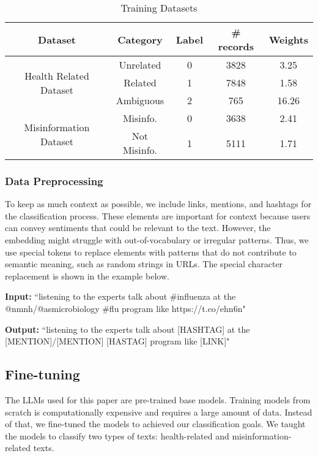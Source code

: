 \begin{table}[htbp]
	\centering
	\caption{Training Datasets}
	{\scriptsize
	\begin{tabular}{||c | c | c | c | c||} 
		\hline
		\textbf{Dataset} &
		\textbf{Category} & \textbf{Label} & \textbf{\# records} & \textbf{Weights} \\
		\hline
		\multirow{3}{6.1em}{Health Related Dataset} & Unrelated & 0 & 3828 & 3.25  \\
		& Related & 1 & 7848 & 1.58  \\ 
		& Ambiguous & 2 & 765 & 16.26 \\
		\hline
		\multirow{2}{6.1em}{Misinformation Dataset} & Misinfo. & 0 & 3638 & 2.41\\ 
		& Not Misinfo. & 1 & 5111 & 1.71 \\
		\hline
	\end{tabular}
	}
	\label{table:dataset}
\end{table}

\subsubsection{Data Preprocessing}
To keep as much context as possible, we include links, mentions, and hashtags for the classification process. These elements are important for context because users can convey sentiments that could be relevant to the text.
However, the embedding might struggle with out-of-vocabulary or irregular patterns. Thus, we use special tokens to replace elements with patterns that do not contribute
to semantic meaning, such as random strings in URLs. The special character replacement is shown in the example below.

{\footnotesize %
\begin{tcolorbox}[colback=gray!5,colframe=black!50,boxrule=0.4pt,arc=2pt,left=0.5mm,right=0.5mm,top=0.1mm,bottom=0.1mm,title=Example]
\textbf{Input:}  
``listening to the experts talk about \#influenza at the @nmnh/@asmicrobiology \#flu program like https://t.co/ehn6n"

\vspace{0.25em}
\textbf{Output:}  
``listening to the experts talk about [HASHTAG] at the [MENTION]/[MENTION] [HASTAG] program like [LINK]"
\end{tcolorbox}
}
\vspace{-0.55em}
\subsection{Fine-tuning}
The LLMs used for this paper are pre-trained base models. Training models from scratch is computationally expensive and requires a large amount of data. Instead of that, we fine-tuned the models to achieved our classification goals. We taught the models to classify two types of texts: health-related and misinformation-related texts. 

